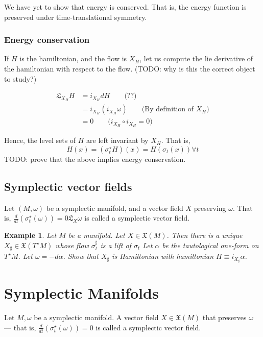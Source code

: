 \documentclass[11pt]{book}
\newcommand{\Lie}{\ensuremath{\mathfrak{L}}}
\newcommand{\Vectorfield}{\ensuremath{\mathfrak{X}}}
\newcommand{\vectorfield}{\ensuremath{\mathfrak{X}}}
\newtheorem{example}[theorem]{Example}
\begin{document}
We have yet to show that energy is conserved. That is, the energy function is
preserved under time-translational symmetry.

\subsection{Energy conservation}
If $H$ is the hamiltonian, and the flow is $X_H$, let us compute the lie
derivative of the hamiltonian with respect to the flow. (TODO: why is this
the correct object to study?)

\begin{align*}
    \Lie_{X_H} H &= i_{X_H} dH \qquad \text{(??)} \\
        &= i_{X_H} (i_{X_H} \omega) \qquad \text{(By definition of $X_H$)} \\
        &= 0 \qquad \text{($i_{X_H} \circ i_{X_H} = 0$)}
\end{align*}

Hence, the level sets of $H$ are left invariant by $X_H$. That is,
$$
H(x) = (\sigma_t^\star H)(x) = H(\sigma_t(x)) \forall t
$$
TODO: prove that the above implies energy conservation.



\section{Symplectic vector fields}
Let $(M, \omega)$ be a symplectic manifold, and a vector field $X$ preserving
$\omega$. That is, $\frac{d}{dt}(\sigma_t^\star(\omega)) = 0 \Lie_X \omega$
is called a symplectic vector field.

\begin{example}
    Let $M$ be a manifold. Let $X \in \Vectorfield(M)$.  Then there is a unique
    $X_\sharp \in \Vectorfield(T^\star M)$ whose flow $\sigma_t^\sharp$ is a 
    lift of $\sigma_t$ Let $\alpha$ be the tautological one-form on $T^\star M$.
    Let $\omega = - d\alpha$. Show that $X_\sharp$ is Hamiltonian with hamiltonian
    $H \equiv i_{X_\sharp} \alpha$.
\end{example}


\chapter{Symplectic Manifolds}
Let $M, \omega$ be a symplectic manifold. A vector field $X \in \vectorfield(M)$
that preserves $\omega$ --- that is, $\frac{d}{dt} \left(\sigma_t^\star (\omega) \right) = 0$
is called a symplectic vector field.
\end{document}
